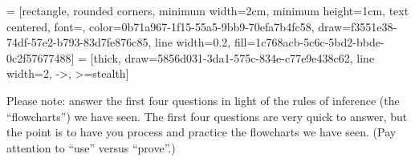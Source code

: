 \documentclass{article}
\begin{document}

 = [rectangle, rounded corners, minimum width=2cm, minimum height=1cm, text centered, font=\normalsize, color=0b71a967-1f15-55a5-9bb9-70efa7b4fc58, draw=f3551e38-74df-57e2-b793-83d7fe876c85, line width=0.2, fill=1c768acb-5c6c-5bd2-bbde-0c2f57677488]
 = [thick, draw=5856d031-3da1-575c-834e-c77e9e438c62, line width=2, ->, >=stealth]

Please note: answer the first four questions in light of the rules of inference
(the ``flowcharts'') we have seen. The first four questions are very quick to
answer, but the point is to have you process and practice the flowcharts we
have seen. (Pay attention to ``use'' versus ``prove''.)
\end{document}
